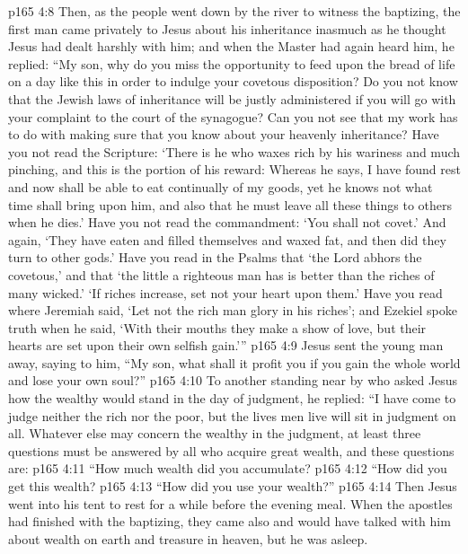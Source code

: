 \pc \vs p165 4:8 Then, as the people went down by the river to witness the baptizing, the first man came privately to Jesus about his inheritance inasmuch as he thought Jesus had dealt harshly with him; and when the Master had again heard him, he replied: “My son, why do you miss the opportunity to feed upon the bread of life on a day like this in order to indulge your covetous disposition? Do you not know that the Jewish laws of inheritance will be justly administered if you will go with your complaint to the court of the synagogue? Can you not see that my work has to do with making sure that you know about your heavenly inheritance? Have you not read the Scripture: ‘There is he who waxes rich by his wariness and much pinching, and this is the portion of his reward: Whereas he says, I have found rest and now shall be able to eat continually of my goods, yet he knows not what time shall bring upon him, and also that he must leave all these things to others when he dies.’ Have you not read the commandment: ‘You shall not covet.’ And again, ‘They have eaten and filled themselves and waxed fat, and then did they turn to other gods.’ Have you read in the Psalms that ‘the Lord abhors the covetous,’ and that ‘the little a righteous man has is better than the riches of many wicked.’ ‘If riches increase, set not your heart upon them.’ Have you read where Jeremiah said, ‘Let not the rich man glory in his riches’; and Ezekiel spoke truth when he said, ‘With their mouths they make a show of love, but their hearts are set upon their own selfish gain.’”\plusone
\vs p165 4:9 Jesus sent the young man away, saying to him, \textcolor{ubdarkred}{“My son, what shall it profit you if you gain the whole world and lose your own soul?”}\plusone
\vs p165 4:10 To another standing near by who asked Jesus how the wealthy would stand in the day of judgment, he replied: \textcolor{ubdarkred}{“I have come to judge neither the rich nor the poor, but the lives men live will sit in judgment on all. Whatever else may concern the wealthy in the judgment, at least three questions must be answered by all who acquire great wealth, and these questions are:}
\pc \vs p165 4:11 \textcolor{ubdarkred}{“\bibnobreakspace How much wealth did you accumulate?}
\vs p165 4:12 \textcolor{ubdarkred}{“\bibnobreakspace How did you get this wealth?}
\vs p165 4:13 \textcolor{ubdarkred}{“\bibnobreakspace How did you use your wealth?”}
\pc \vs p165 4:14 Then Jesus went into his tent to rest for a while before the evening meal. When the apostles had finished with the baptizing, they came also and would have talked with him about wealth on earth and treasure in heaven, but he was asleep.
